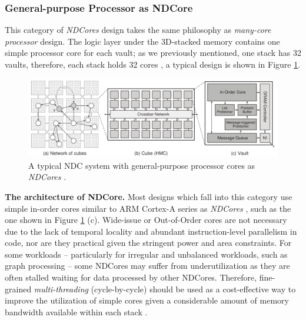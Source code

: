 \documentclass[letterpaper, 11pt, conference, margin=1in]{ieeeconf}   %
\begin{document}
\subsubsection{\bf General-purpose Processor as NDCore}
This category of \textit{NDCores} design takes the same philosophy as \textit{many-core processor} design. The logic layer under the 3D-stacked memory contains one simple processor core for each vault; as we previously mentioned, one stack has 32 vaults, therefore, each stack holds 32 cores \cite{Pugsley2014NDCAT, Ahn:2015:SPA:2749469.2750386}, a typical design is shown in Figure \ref{fig:tesseract}.
\begin{figure}[h]
  \includegraphics[scale=0.33]{figures/tesseract_2.png}
  \caption{A typical NDC system with general-purpose processor cores as \textit{NDCores} \cite{Ahn:2015:SPA:2749469.2750386}.}
  \label{fig:tesseract}
\end{figure}
\textbf{The architecture of NDCore.} Most designs which fall into this category use simple in-order cores similar to ARM Cortex-A series as \textit{NDCores} \cite{ARM-Cortex-A5, ARM-Cortex-A7}, such as the one shown in Figure \ref{fig:tesseract} (c). Wide-issue or Out-of-Order cores are not necessary due to the lack of temporal locality and abundant instruction-level parallelism in code, nor are they practical given the stringent power and area constraints. For some workloads -- particularly for irregular and unbalanced workloads, such as graph processing -- some NDCores may suffer from underutilization as they are often stalled waiting for data processed by other NDCores. Therefore, fine-grained \textit{multi-threading} (cycle-by-cycle) should be used as a cost-effective way to improve the utilization of simple cores given a considerable amount of memory bandwidth available within each stack \cite{Alverson:1990:TCS:77726.255132, Gao2015}.
\end{document}
